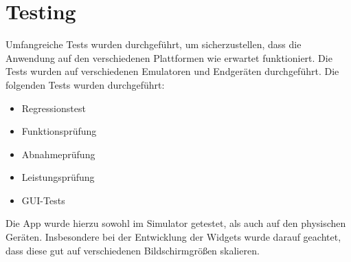 
\chapter{Testing}

Umfangreiche Tests wurden durchgeführt, um sicherzustellen, dass die Anwendung auf den verschiedenen Plattformen wie erwartet funktioniert.
Die Tests wurden auf verschiedenen Emulatoren und Endgeräten durchgeführt.
Die folgenden Tests wurden durchgeführt:

\begin{itemize}
    \item Regressionstest
    \item Funktionsprüfung
    \item Abnahmeprüfung
    \item Leistungsprüfung
    \item GUI-Tests
\end{itemize}

Die App wurde hierzu sowohl im Simulator getestet, als auch auf den physischen Geräten. Insbesondere bei der Entwicklung der Widgets wurde darauf geachtet, dass diese gut auf verschiedenen Bildschirmgrößen skalieren.